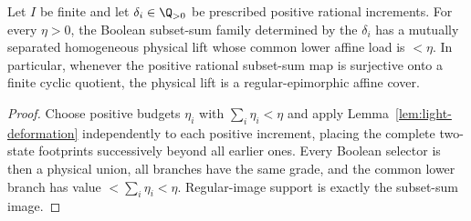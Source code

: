 \begin{corollary}\label{cor:finite-support-epi}
Let $I$ be finite and let $\delta_i\in\Q_{>0}$ be prescribed positive rational
increments. For every $\eta>0$, the Boolean subset-sum family determined by
the $\delta_i$ has a mutually separated homogeneous physical lift whose common
lower affine load is $<\eta$. In particular, whenever the positive rational
subset-sum map is surjective onto a finite cyclic quotient, the physical lift
is a regular-epimorphic affine cover.
\end{corollary}

\begin{proof}
Choose positive budgets $\eta_i$ with $\sum_i\eta_i<\eta$ and apply
Lemma~\ref{lem:light-deformation} independently to each positive increment,
placing the complete two-state footprints successively beyond all earlier
ones. Every Boolean selector is then a physical union, all branches have the
same grade, and the common lower branch has value $<\sum_i\eta_i<\eta$.
Regular-image support is exactly the subset-sum image.
\end{proof}
